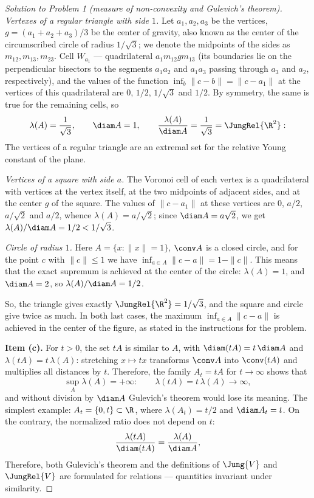 \documentclass[a4paper,12pt]{report}
\begin{document}
\begin{proof}[Solution to Problem \textup{1} \textup{(}measure of non-convexity and Gulevich's theorem\textup{)}]
\textit{Vertexes of a regular triangle with side $1$.} Let $a_1, a_2, a_3$ be the vertices, $g = (a_1 + a_2 + a_3)/3$ be the center of gravity, also known as the center of the circumscribed circle of radius $1/\sqrt3$; we denote the midpoints of the sides as $m_{12}, m_{13}, m_{23}$. Cell $W_{a_1}$ --- quadrilateral $a_1 m_{12} g m_{13}$ \textup{(}its boundaries lie on the perpendicular bisectors to the segments $a_1a_2$ and $a_1a_3$ passing through $a_3$ and $a_2$, respectively\textup{)}, and the values of the function $\inf_{b}\|c-b\| = \|c - a_1\|$ at the vertices of this quadrilateral are $0$, $1/2$, $1/\sqrt3$ and $1/2$. By symmetry, the same is true for the remaining cells, so
\[
\lambda(A) = \frac{1}{\sqrt3}, \qquad \diam A = 1, \qquad \frac{\lambda(A)}{\diam A} = \frac{1}{\sqrt3} = \JungRel{\R^2}:
\]
The vertices of a regular triangle are an extremal set for the relative Young constant of the plane.

\textit{Vertices of a square with side $a$.} The Voronoi cell of each vertex is a quadrilateral with vertices at the vertex itself, at the two midpoints of adjacent sides, and at the center $g$ of the square. The values of $\|c - a_1\|$ at these vertices are $0$, $a/2$, $a/\sqrt2$ and $a/2$, whence $\lambda(A) = a/\sqrt2$; since $\diam A = a\sqrt2$, we get $\lambda(A)/\diam A = 1/2 < 1/\sqrt3$.

\textit{Circle of radius $1$.} Here $A = \{x : \|x\| = 1\}$, $\conv A$ is a closed circle, and for the point $c$ with $\|c\| \le 1$ we have $\inf_{a \in A} \|c - a\| = 1 - \|c\|$. This means that the exact supremum is achieved at the center of the circle: $\lambda(A) = 1$, and $\diam A = 2$, so $\lambda(A)/\diam A = 1/2$.

So, the triangle gives exactly $\JungRel{\R^2} = 1/\sqrt3$, and the square and circle give twice as much. In both last cases, the maximum $\inf_{a \in A} \|c - a\|$ is achieved in the center of the figure, as stated in the instructions for the problem.

\textbf{Item \textup{(c)}.} For $t > 0$, the set $tA$ is similar to $A$, with $\diam(tA) = t\,\diam A$ and $\lambda(tA) = t\,\lambda(A)$: stretching $x \mapsto tx$ transforms $\conv A$ into $\conv(tA)$ and multiplies all distances by $t$. Therefore, the family $A_t = tA$ for $t \to \infty$ shows that
\[
\sup_A \lambda(A) = +\infty: \qquad \lambda(tA) = t\,\lambda(A) \to \infty,
\]
and without division by $\diam A$ Gulevich's theorem would lose its meaning. The simplest example: $A_t = \{0, t\} \subset \R$, where $\lambda(A_t) = t/2$ and $\diam A_t = t$. On the contrary, the normalized ratio does not depend on $t$:
\[
\frac{\lambda(tA)}{\diam(tA)} = \frac{\lambda(A)}{\diam A},
\]
Therefore, both Gulevich's theorem and the definitions of $\Jung{V}$ and $\JungRel{V}$ are formulated for relations --- quantities invariant under similarity.

\end{proof}
\end{document}
